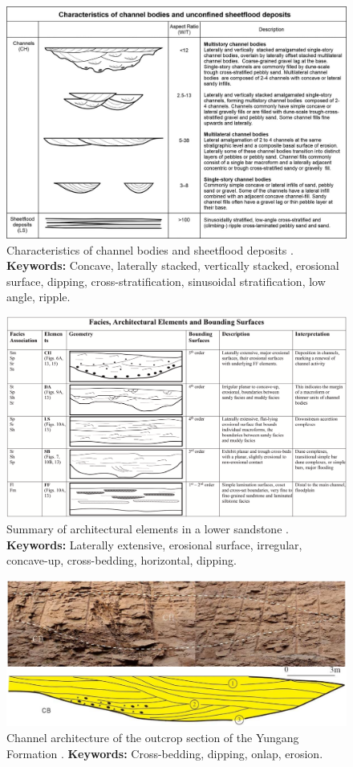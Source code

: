 \begin{figure}[h!]
    \centering
    \includegraphics[width=0.75\linewidth]{Figures/0.4Field/Winsemann2022.png}
    \caption[Characteristics of channel bodies and sheetflood deposits]{Characteristics of channel bodies and sheetflood deposits \citep{Winsemann2022}. \textbf{Keywords:} Concave, laterally stacked, vertically stacked, erosional surface, dipping, cross-stratification, sinusoidal stratification, low angle, ripple.}
    \label{fig:Winsemann22-1}
\end{figure}

\begin{figure}[h!]
    \centering
    \includegraphics[width=0.75\linewidth]{Figures/0.4Field/Poursoltani2020.png}
    \caption[Summary of architectural elements in a lower sandstone]{Summary of architectural elements in a lower sandstone \citep{Poursoltani2020}. \textbf{Keywords:} Laterally extensive, erosional surface, irregular, concave-up, cross-bedding, horizontal, dipping.}
    \label{fig:Poursoltani20-1}
\end{figure}

\begin{figure}[h!]
    \centering
    \includegraphics[width=0.75\linewidth]{Figures/0.4Field/Guo2022_2.png}
    \caption[Channel architecture of the outcrop section of the Yungang Formation (1)]{Channel architecture of the outcrop section of the Yungang Formation \citep{Guo2022}. \textbf{Keywords:} Cross-bedding, dipping, onlap, erosion.}
    \label{fig:Guo2022-2}
\end{figure}


